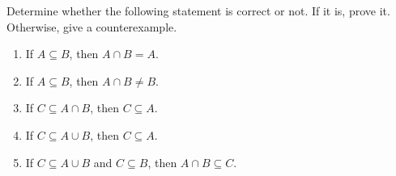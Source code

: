 \begin{exercises}
\begin{problist}
		    \prob 
		    Determine whether the following statement is correct or not. If it is, prove it. Otherwise, give a counterexample.
		    \begin{enumerate}
		        \item If $A \subseteq B$, then $A \cap B = A$.
		        \item If $A \subseteq B$, then $A \cap B \neq B$.
		        \item If $C \subseteq A \cap B$, then $C \subseteq A$.
		        \item If $C \subseteq A \cup B$, then $C \subseteq A$.
		        \item If $C \subseteq A \cup B$ and $C \subseteq B$, then $A \cap B \subseteq C$.
		        
		    \end{enumerate}
		
	\end{problist}
\end{exercises}
